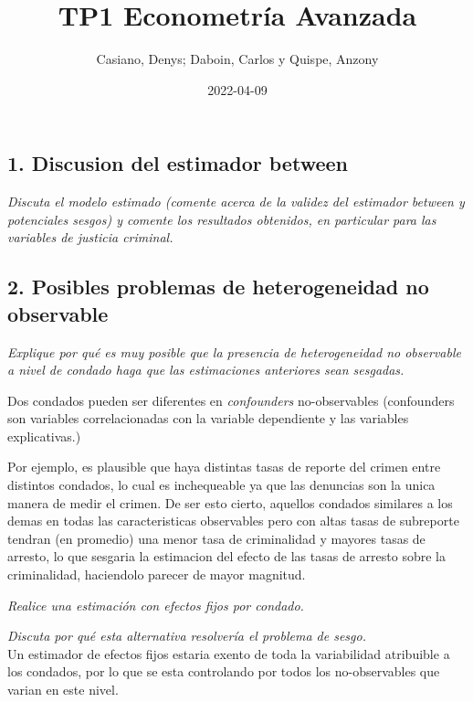 \documentclass[
]{article}
\title{TP1 Econometría Avanzada}
\author{Casiano, Denys; Daboin, Carlos y Quispe, Anzony}
\date{2022-04-09}
\begin{document}
\maketitle

\hypertarget{discusion-del-estimador-between}{%
\subsection{1. Discusion del estimador
between}\label{discusion-del-estimador-between}}

\emph{Discuta el modelo estimado (comente acerca de la validez del
estimador between y potenciales sesgos) y comente los resultados
obtenidos, en particular para las variables de justicia criminal.}

\hypertarget{posibles-problemas-de-heterogeneidad-no-observable}{%
\subsection{2. Posibles problemas de heterogeneidad no
observable}\label{posibles-problemas-de-heterogeneidad-no-observable}}

\emph{Explique por qué es muy posible que la presencia de heterogeneidad
no observable a nivel de condado haga que las estimaciones anteriores
sean sesgadas. }

Dos condados pueden ser diferentes en \emph{confounders} no-observables
(confounders son variables correlacionadas con la variable dependiente y
las variables explicativas.)

Por ejemplo, es plausible que haya distintas tasas de reporte del crimen
entre distintos condados, lo cual es inchequeable ya que las denuncias
son la unica manera de medir el crimen. De ser esto cierto, aquellos
condados similares a los demas en todas las caracteristicas observables
pero con altas tasas de subreporte tendran (en promedio) una menor tasa
de criminalidad y mayores tasas de arresto, lo que sesgaria la
estimacion del efecto de las tasas de arresto sobre la criminalidad,
haciendolo parecer de mayor magnitud.

\emph{Realice una estimación con efectos fijos por condado.}

\emph{Discuta por qué esta alternativa resolvería el problema de sesgo.
}\\
Un estimador de efectos fijos estaria exento de toda la variabilidad
atribuible a los condados, por lo que se esta controlando por todos los
no-observables que varian en este nivel.
\end{document}
